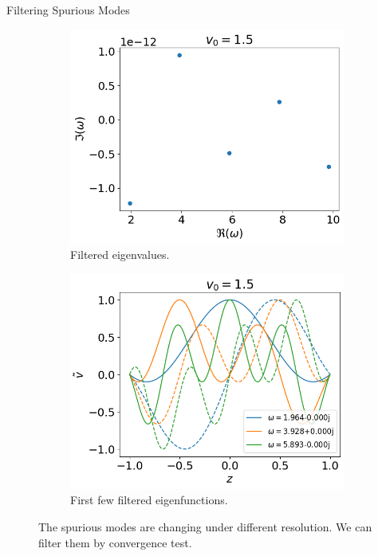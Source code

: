 \begin{frame}{Filtering Spurious Modes}
  \begin{figure}[htbp]
    \centering
    \begin{subfigure}[b]{0.5\linewidth}
      \includegraphics[width=\linewidth]{figures/eigvals-good} 
      \caption{Filtered eigenvalues.}
    \end{subfigure}%
    \begin{subfigure}[b]{0.5\linewidth}
      \includegraphics[width=\linewidth]{figures/eigvecs-good} 
      \caption{First few filtered eigenfunctions.}
    \end{subfigure}
    \caption{The spurious modes are changing under different resolution. We can filter them by convergence test.}
    \label{fig:results-good}
  \end{figure}
\end{frame}
